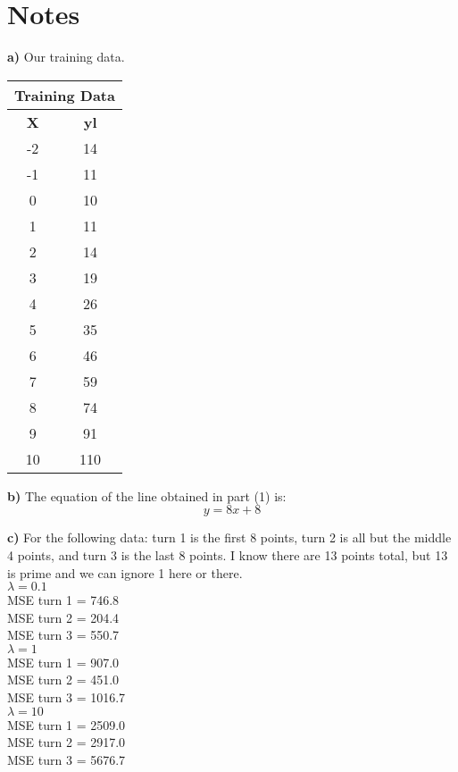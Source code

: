 \documentclass{article}
\begin{document}
\section*{Notes}

\hspace{1em} \textbf{a)} Our training data.

\begin{center}
\begin{tabular}{|c|c|}
	\hline
	\multicolumn{2}{|c|}{\textbf{Training Data}} \\\hline
	\textbf{X} & \textbf{yl} \\\hline
	-2 & 14 \\
	-1 & 11\\
	0 & 10\\
	1 & 11 \\
	2 & 14\\
	3 & 19 \\
	4 & 26\\
	5 & 35\\
	6 & 46\\
	7 & 59\\
	8 & 74\\
	9 & 91\\
	10 & 110\\
	\hline
\end{tabular}
\end{center}

\textbf{b)} The equation of the line obtained in part (1) is: $$y = 8 x  + 8$$ 

\textbf{c)} For the following data: turn 1 is the first 8 points, turn 2 is all but the middle 4 points, and turn 3 is the last 8 points. 
I know there are 13 points total, but 13 is prime and we can ignore 1 here or there. \\

 $\lambda = 0.1$ \\
 MSE turn  1  =  746.8 \\
MSE turn  2  =  204.4 \\
MSE turn  3  =  550.7 \\

 $\lambda = 1$ \\
MSE turn  1  =  907.0 \\
MSE turn  2  =  451.0 \\
MSE turn  3  =  1016.7 \\

 $\lambda = 10$ \\
MSE turn  1  =  2509.0 \\
MSE turn  2  =  2917.0 \\
MSE turn  3  =  5676.7 \\
\end{document}
